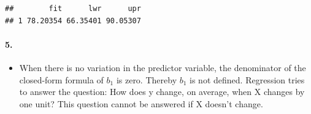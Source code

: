 \documentclass[]{article}
\providecommand{\tightlist}{%
  \setlength{\itemsep}{0pt}\setlength{\parskip}{0pt}}
\let\oldparagraph\paragraph
\renewcommand{\paragraph}[1]{\oldparagraph{#1}\mbox{}}
\begin{document}
\begin{verbatim}
##        fit      lwr      upr
## 1 78.20354 66.35401 90.05307
\end{verbatim}

\paragraph{\texorpdfstring{5. }{5.  }}\label{section}

\begin{itemize}
\tightlist
\item
  When there is no variation in the predictor variable, the denominator
  of the closed-form formula of \(b_{1}\) is zero. Thereby \(b_{1}\) is
  not defined. Regression tries to answer the question: How does y
  change, on average, when X changes by one unit? This question cannot
  be answered if X doesn't change.
\end{itemize}
\end{document}
